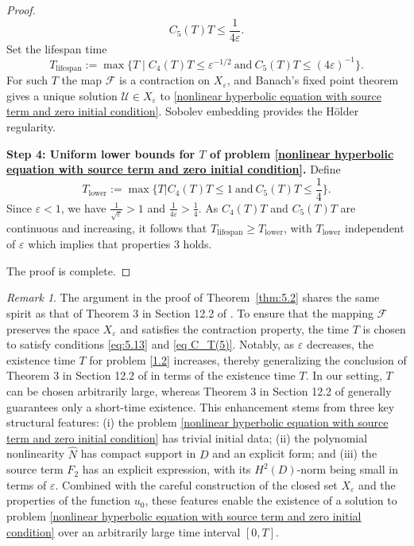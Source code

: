 \documentclass[11pt,reqno,oneside]{amsart}
\numberwithin{equation}{section}
\theoremstyle{definition}
\theoremstyle{remark}
\newtheorem{remark}[theorem]{Remark}
\numberwithin{equation}{section}
\begin{document}
\begin{proof}
		\begin{equation}\label{eq C_T(5)}
			C_5(T) T \leqslant \frac{1}{4{\varepsilon}}.
		\end{equation}
		Set the lifespan time
	\begin{equation}\label{eq:T_lifespan}
		T_{\mathrm{lifespan}} := \max\{T \mid C_4(T)T \le \varepsilon^{-1/2}
		\ \text{and}\ C_5(T)T \le (4\varepsilon)^{-1}\}.
	\end{equation}
	For such $T$ the map $\mathscr{F}$ is a contraction on $X_\varepsilon$, and
	Banach's fixed point theorem gives a unique solution $\mathscr{U}\in X_\varepsilon$
	to \eqref{nonlinear hyperbolic equation with source term and zero initial condition}. Sobolev embedding provides the H\"older regularity.
		
		
		\medskip
		\textbf{Step 4: Uniform lower bounds for \(T\) of problem \eqref{nonlinear hyperbolic equation with source term and zero initial condition}.}
		Define	
		\begin{equation}\label{5.17}
			T_{\mathrm{lower}}:=\max\{T|	C_4(T) T \leqslant 1\ \text{and}\ C_5(T) T \leqslant \frac{1}{4}\}.
		\end{equation}
		Since \(\varepsilon < 1\), we have \(\frac{1}{\sqrt{\varepsilon}}>1\) and \(\frac{1}{4 \varepsilon} > \frac{1}{4}\). As \(C_4(T)T\) and \(C_5(T)T\) are continuous and increasing, it follows that \( T_{\mathrm{lifespan}}\geqslant T_{\mathrm{lower}} \), with \(T_{\mathrm{lower}}\) independent of \(\varepsilon\) which implies that properties 3 holds.
		
		The proof is complete.
	\end{proof}
	
	\begin{remark}\label{remark 5.3}
		The argument in the proof of Theorem~\ref{thm:5.2} shares the same spirit as that of Theorem 3 in Section 12.2 of \cite{Evans}. To ensure that the mapping $\mathscr{F}$ preserves the space $X_{\varepsilon}$ and satisfies the contraction property, the time $T$ is chosen to satisfy conditions \eqref{eq:5.13} and \eqref{eq C_T(5)}. Notably, as $\varepsilon$ decreases, the existence time $T$ for problem \eqref{1.2} increases, thereby generalizing the conclusion of Theorem 3 in Section 12.2 of \cite{Evans} in terms of the existence time $T$. In our setting, $T$ can be chosen arbitrarily large, whereas Theorem 3 in Section 12.2 of \cite{Evans} generally guarantees only a short-time existence. This enhancement stems from three key structural features: (i) the problem \eqref{nonlinear hyperbolic equation with source term and zero initial condition} has trivial initial data; (ii) the polynomial nonlinearity $\hat{N}$ has compact support in $D$ and an explicit form; and (iii) the source term $F_2$ has an explicit expression, with its $H^2(D)$-norm being small in terms of $\varepsilon$. Combined with the careful construction of the closed set $X_\varepsilon$ and the properties of the function $u_0$, these features enable the existence of a solution to problem \eqref{nonlinear hyperbolic equation with source term and zero initial condition} over an arbitrarily large time interval $[0, T]$.	\end{remark}
	
\end{document}
